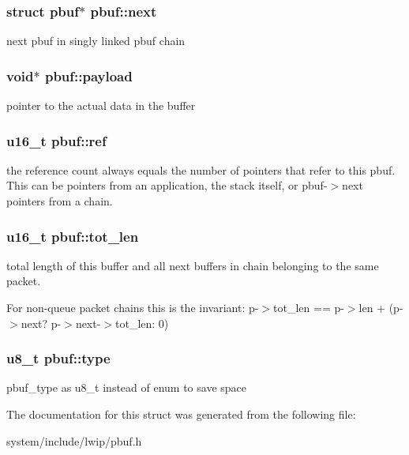 \subsubsection[{next}]{\setlength{\rightskip}{0pt plus 5cm}struct {\bf pbuf}$\ast$ pbuf\+::next}\label{structpbuf_a5e5763c94fd18d78937b0b58ce7df341}
next pbuf in singly linked pbuf chain \hypertarget{structpbuf_a8d32dc3e964369d4eec638fc37fbc460}{}
\subsubsection[{payload}]{\setlength{\rightskip}{0pt plus 5cm}void$\ast$ pbuf\+::payload}\label{structpbuf_a8d32dc3e964369d4eec638fc37fbc460}
pointer to the actual data in the buffer \hypertarget{structpbuf_a18e2c02942feb1baa3756fcd585b6731}{}
\subsubsection[{ref}]{\setlength{\rightskip}{0pt plus 5cm}u16\+\_\+t pbuf\+::ref}\label{structpbuf_a18e2c02942feb1baa3756fcd585b6731}
the reference count always equals the number of pointers that refer to this pbuf. This can be pointers from an application, the stack itself, or pbuf-\/$>$next pointers from a chain. \hypertarget{structpbuf_a5259e7ec29bab9c0999b64f2e86b411f}{}
\subsubsection[{tot\+\_\+len}]{\setlength{\rightskip}{0pt plus 5cm}u16\+\_\+t pbuf\+::tot\+\_\+len}\label{structpbuf_a5259e7ec29bab9c0999b64f2e86b411f}
total length of this buffer and all next buffers in chain belonging to the same packet.

For non-\/queue packet chains this is the invariant\+: p-\/$>$tot\+\_\+len == p-\/$>$len + (p-\/$>$next? p-\/$>$next-\/$>$tot\+\_\+len\+: 0) \hypertarget{structpbuf_afd7bff5210a022424caa97d2f25fe8e6}{}
\subsubsection[{type}]{\setlength{\rightskip}{0pt plus 5cm}u8\+\_\+t pbuf\+::type}\label{structpbuf_afd7bff5210a022424caa97d2f25fe8e6}
pbuf\+\_\+type as u8\+\_\+t instead of enum to save space 

The documentation for this struct was generated from the following file\+:\begin{DoxyCompactItemize}
\item 
system/include/lwip/pbuf.\+h\end{DoxyCompactItemize}

